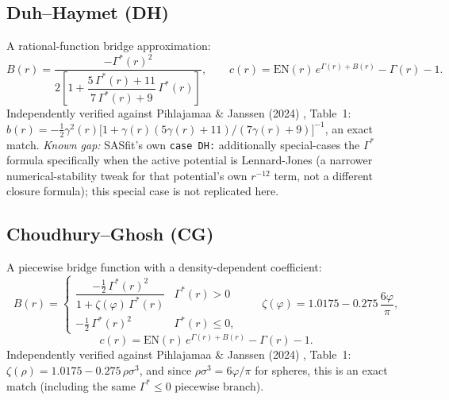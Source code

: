 \documentclass[11pt,a4paper]{article}
\newcommand{\code}[1]{\texttt{#1}}
\begin{document}
\subsection{Duh--Haymet (DH) \cite{duhhaymet1995}}
A rational-function bridge approximation:
\begin{equation}
  B(r) = \frac{-\Gamma^*(r)^2}{2\left[1+\dfrac{5\,\Gamma^*(r)+11}{7\,\Gamma^*(r)+9}\,\Gamma^*(r)\right]}, \qquad
  c(r) = \mathrm{EN}(r)\,e^{\Gamma(r)+B(r)} - \Gamma(r) - 1.
\end{equation}
Independently verified against Pihlajamaa \& Janssen (2024)
\cite{PihlajamaaJanssen2024}, Table~1: $b(r)=-\tfrac12\gamma^2(r)\big[1+\gamma(r)(5\gamma(r)+11)/(7\gamma(r)+9)\big]^{-1}$,
an exact match. \emph{Known gap:} SASfit's own \code{case DH:} additionally
special-cases the $\Gamma^*$ formula specifically when the active potential is
Lennard-Jones (a narrower numerical-stability tweak for that potential's own
$r^{-12}$ term, not a different closure formula); this special case is not
replicated here.

\subsection{Choudhury--Ghosh (CG) \cite{choudhuryghosh2002}}
A piecewise bridge function with a density-dependent coefficient:
\begin{equation}
  B(r) = \begin{cases} \dfrac{-\tfrac12\,\Gamma^*(r)^2}{1+\zeta(\varphi)\,\Gamma^*(r)} & \Gamma^*(r)>0\\[2ex]
    -\tfrac12\,\Gamma^*(r)^2 & \Gamma^*(r)\le0, \end{cases}
  \qquad \zeta(\varphi) = 1.0175 - 0.275\,\frac{6\varphi}{\pi},
\end{equation}
\begin{equation}
  c(r) = \mathrm{EN}(r)\,e^{\Gamma(r)+B(r)} - \Gamma(r) - 1.
\end{equation}
Independently verified against Pihlajamaa \& Janssen (2024)
\cite{PihlajamaaJanssen2024}, Table~1: $\zeta(\rho)=1.0175-0.275\,\rho\sigma^3$, and
since $\rho\sigma^3=6\varphi/\pi$ for spheres, this is an exact match
(including the same $\Gamma^*\le0$ piecewise branch).
\end{document}

